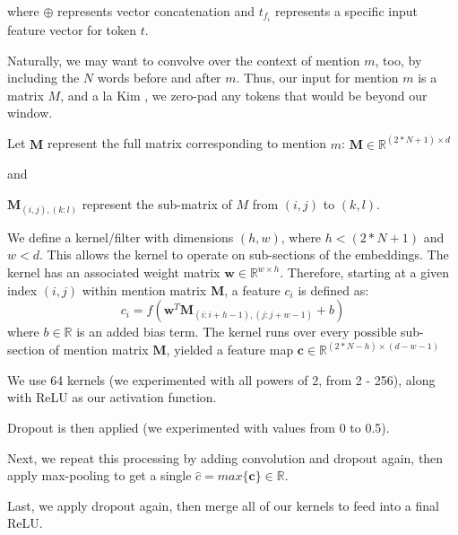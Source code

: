 \documentclass[11pt,a4paper]{article}
\begin{document}
where $\oplus$ represents vector concatenation and $t_{f_{i}}$ represents a specific input feature vector for token $t$.

Naturally, we may want to convolve over the context of mention $m$, too, by including the $N$ words before and after $m$.  Thus, our input for mention $m$ is a matrix $M$, and a la Kim , we zero-pad any tokens that would be beyond our window.

\vspace{3mm}

Let $\textbf{M}$ represent the full matrix corresponding to mention $m$: $\textbf{M} \in \mathbb{R}^{(2*N+1) \times d}$

\vspace{1mm}

and

\vspace{1mm}

$\textbf{M}_{(i,j),(k:l)}$ represent the sub-matrix of $M$ from $(i,j)$ to $(k,l)$.

\vspace{3mm}

We define a kernel/filter with dimensions $(h,w)$, where $h < (2*N+1)$ and $w < d$.  This allows the kernel to operate on sub-sections of the embeddings.  The kernel has an associated weight matrix $\textbf{w} \in \mathbb{R}^{w \times h}$.  Therefore, starting at a given index $(i,j)$ within mention matrix $\textbf{M}$, a feature $c_{i}$ is defined as:
\begin{equation}
c_{i} = f(\textbf{w}^{T}\textbf{M}_{(i:i+h-1),(j:j+w-1)} + b)
\end{equation}
where $b \in \mathbb{R}$ is an added bias term.  The kernel runs over every possible sub-section of mention matrix $\textbf{M}$, yielded a feature map $\textbf{c} \in \mathbb{R}^{(2*N-h) \times (d-w-1)}$

\vspace{3mm}

We use 64 kernels (we experimented with all powers of 2, from 2 - 256), along with ReLU as our activation function.

Dropout is then applied (we experimented with values from 0 to 0.5).

Next, we repeat this processing by adding convolution and dropout again, then apply max-pooling to get a single $\hat{c} = max\{\textbf{c\}} \in \mathbb{R}$.

Last, we apply dropout again, then merge all of our kernels to feed into a final ReLU.
\end{document}
